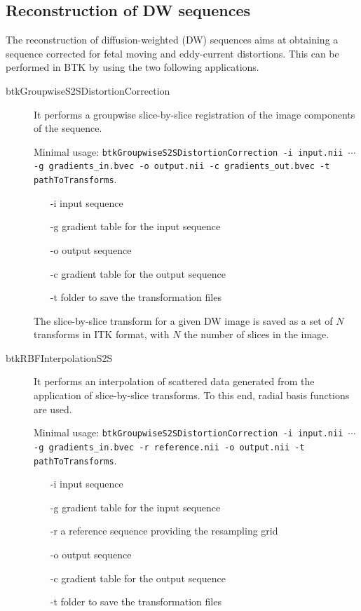 \subsection{Reconstruction of DW sequences}
\label{subsec:diff_rec}
The reconstruction of diffusion-weighted (DW) sequences aims at
obtaining a sequence corrected for fetal moving and eddy-current distortions.
This can be performed in BTK by using the two following applications. 
\begin{description}
\item[btkGroupwiseS2SDistortionCorrection] It performs a groupwise
slice-by-slice registration of the image components of the sequence.

Minimal usage: \texttt{btkGroupwiseS2SDistortionCorrection -i input.nii
$\cdots$ -g gradients\_in.bvec -o output.nii -c gradients\_out.bvec -t
pathToTransforms}.

\begin{itemize}
 \item[-i] input sequence
 \item[-g] gradient table for the input sequence
 \item[-o] output sequence 
 \item[-c] gradient table for the output sequence
 \item[-t] folder to save the transformation files
\end{itemize}

The slice-by-slice transform for a given DW image is saved as a set of $N$
transforms in ITK format, with $N$ the number of slices in the image.

\item[btkRBFInterpolationS2S] It performs an interpolation of scattered data
generated from the application of slice-by-slice transforms. To this end,
radial basis functions are used.

Minimal usage: \texttt{btkGroupwiseS2SDistortionCorrection -i input.nii
$\cdots$ -g gradients\_in.bvec -r reference.nii -o output.nii -t
pathToTransforms}.

\begin{itemize}
 \item[-i] input sequence
 \item[-g] gradient table for the input sequence
 \item[-r] a reference sequence providing the resampling grid
 \item[-o] output sequence 
 \item[-c] gradient table for the output sequence
 \item[-t] folder to save the transformation files \\
\end{itemize}

\end{description}


